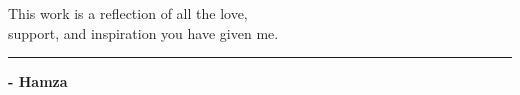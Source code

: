 \begin{center}
\begin{center}
\begin{minipage}{0.85\textwidth}
    This work is a reflection of all the love,\\
    support, and inspiration you have given me.
    \end{minipage}
  \end{center}
  
  \vspace{0.5em}
  \begin{minipage}{0.4\textwidth}
  \centering
  \rule{\textwidth}{0.4pt}
  \end{minipage}
  
  \begin{flushright}
    \vspace{0.5em}
    \fontsize{16}{16}\selectfont\bfseries - Hamza
  \end{flushright}
\end{center}

\clearpage